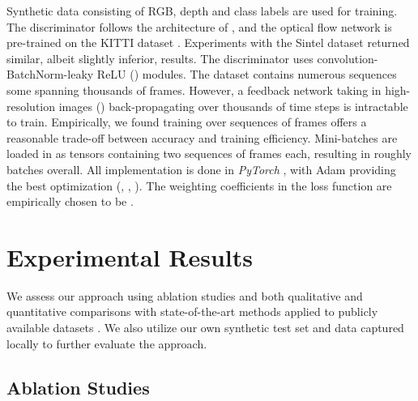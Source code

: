 \documentclass[10pt,twocolumn,letterpaper]{article}
\begin{document}
{Synthetic data \cite{RosCVPR16} consisting of RGB, depth and class labels are used for training. The discriminator follows the architecture of \cite{radford2015unsupervised}, and the optical flow network \cite{ranjan2017optical} is pre-trained on the KITTI dataset \cite{Menze2018JPRS}. Experiments with the Sintel dataset \cite{ButlerECCV2012} returned similar, albeit slightly inferior, results. The discriminator uses convolution-BatchNorm-leaky ReLU () modules. The dataset \cite{RosCVPR16} contains numerous sequences some spanning thousands of frames. However, a feedback network taking in high-resolution images () back-propagating over thousands of time steps is intractable to train. Empirically, we found training over sequences of  frames offers a reasonable trade-off between accuracy and training efficiency. Mini-batches are loaded in as tensors containing two sequences of  frames each, resulting in roughly  batches overall. All implementation is done in \emph{PyTorch} \cite{pytorch}, with Adam \cite{kingma2014adam} providing the best optimization (, , ). The weighting coefficients in the loss function are empirically chosen to be .\vspace{-0.1cm}

\section{Experimental Results}
\label{sec:results}\vspace{-0.1cm}

We assess our approach using ablation studies and both qualitative and quantitative comparisons with state-of-the-art methods applied to publicly available datasets \cite{Alhaija2018IJCV, brostow2009semantic, cordts2016cityscapes, Geiger2013IJRR, Menze2018JPRS}. We also utilize our own synthetic test set and data captured locally to further evaluate the approach.

\subsection{Ablation Studies}
\label{ssec:ablation}\vspace{-0.1cm}

}
\end{document}
